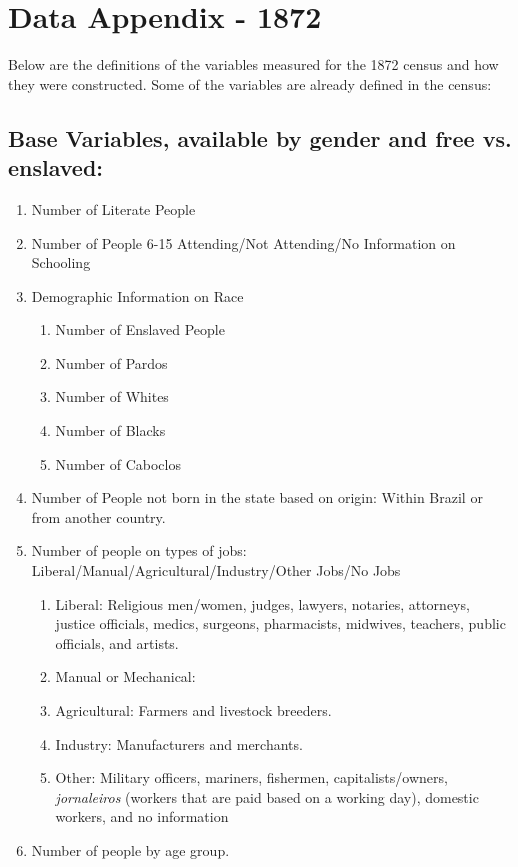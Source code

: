 \documentclass{article}
\begin{document}

\section{Data Appendix - 1872}
\label{app:variable_construction_1872}

Below are the definitions of the variables measured for the 1872 census and how they were constructed. Some of the variables are already defined in the census:

\subsection{Base Variables, available by gender and free vs. enslaved:}

\begin{enumerate}
  \item Number of Literate People
  \item Number of People 6-15 Attending/Not Attending/No Information on Schooling
  \item Demographic Information on Race
    \begin{enumerate}
      \item Number of Enslaved People
      \item Number of Pardos
      \item Number of Whites
      \item Number of Blacks
      \item Number of Caboclos
    \end{enumerate}
  \item Number of People not born in the state based on origin: Within Brazil or from another country.
  \item Number of people on types of jobs: Liberal/Manual/Agricultural/Industry/Other Jobs/No Jobs
    \begin{enumerate}
      \item Liberal: Religious men/women, judges, lawyers, notaries, attorneys, justice officials, medics, surgeons, pharmacists, midwives, teachers, public officials, and artists.
      \item Manual or Mechanical: 
      \item Agricultural: Farmers and livestock breeders.
      \item Industry: Manufacturers and merchants.
      \item Other: Military officers, mariners, fishermen, capitalists/owners, \textit{jornaleiros} (workers that are paid based on a working day), domestic workers, and no information
    \end{enumerate}
  \item Number of people by age group.
\end{enumerate}
\end{document}
